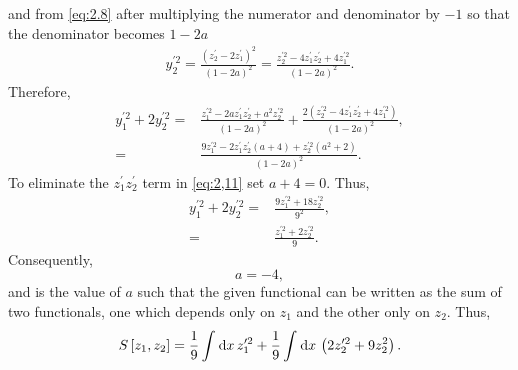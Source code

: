 and from \eqref{eq:2.8} after multiplying the numerator and denominator by $-1$ so that the denominator becomes $1-2a$
\begin{align*}
	y_2^{\prime2} = \frac{\left(z_2^\prime - 2z_1^\prime\right)^2}{\left(1-2a\right)^2} = \frac{z_2^{\prime2} -4z_1^\prime z_2^\prime + 4z_1^{\prime2}}{\left(1-2a\right)^2}.
\end{align*}
Therefore,
\begin{align}
	y_1^{\prime2} + 2y_2^{\prime2} =& \frac{z_1^{\prime2} - 2az_1^\prime z_2^\prime + a^2 z_2^{\prime2}}{\left(1-2a\right)^2} + \frac{2\left(z_2^{\prime2} -4z_1^\prime z_2^\prime + 4z_1^{\prime2}\right)}{\left(1-2a\right)^2},\nonumber\\
	\label{eq:2,11}
	=& \frac{9z_1^{\prime2} -2z_1^\prime z_2^\prime\left(a+4\right) + z_2^{\prime2}\left(a^2 + 2\right)}{\left(1-2a\right)^2}.
\end{align}
To eliminate the $z_1^\prime z_2^\prime$ term in \eqref{eq:2,11} set $a+4 = 0$. Thus,
\begin{align}
	y_1^{\prime2} + 2y_2^{\prime2} =& \frac{9z_1^{\prime2} + 18z_2^{\prime2}}{9^2},\nonumber\\
	=& \frac{z_1^{\prime2} + 2z_2^{\prime2}}{9}.
\end{align}
Consequently,
\[
	a = -4,
\]
and is the value of $a$ such that the given functional can be written as the sum of two functionals, one which depends only on $z_1$ and the other only on $z_2$. Thus,
\[
	S\left[z_1,z_2\right] = \frac{1}{9}\int_{}^{}\mathrm{d} x\, z_1^{\prime2} + \frac{1}{9}\int_{}^{}\mathrm{d} x\,\left(2z_2^{\prime2} + 9z_2^2\right).
\]
